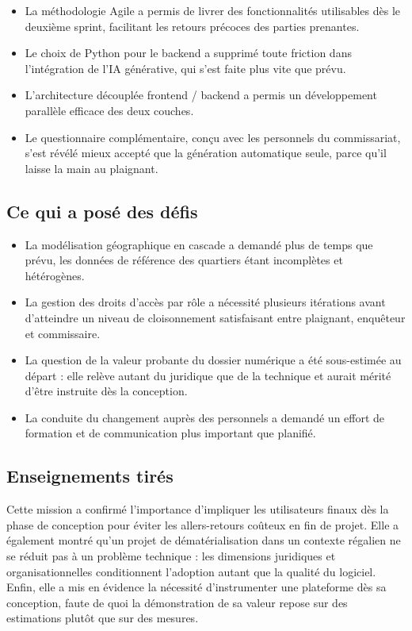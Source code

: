 \begin{itemize}
    \item La méthodologie Agile a permis de livrer des fonctionnalités utilisables dès le deuxième sprint, facilitant les retours précoces des parties prenantes.
    \item Le choix de Python pour le backend a supprimé toute friction dans l'intégration de l'IA générative, qui s'est faite plus vite que prévu.
    \item L'architecture découplée frontend / backend a permis un développement parallèle efficace des deux couches.
    \item Le questionnaire complémentaire, conçu avec les personnels du commissariat, s'est révélé mieux accepté que la génération automatique seule, parce qu'il laisse la main au plaignant.
\end{itemize}

\subsection{Ce qui a posé des défis}

\begin{itemize}
    \item La modélisation géographique en cascade a demandé plus de temps que prévu, les données de référence des quartiers étant incomplètes et hétérogènes.
    \item La gestion des droits d'accès par rôle a nécessité plusieurs itérations avant d'atteindre un niveau de cloisonnement satisfaisant entre plaignant, enquêteur et commissaire.
    \item La question de la valeur probante du dossier numérique a été sous-estimée au départ : elle relève autant du juridique que de la technique et aurait mérité d'être instruite dès la conception.
    \item La conduite du changement auprès des personnels a demandé un effort de formation et de communication plus important que planifié.
\end{itemize}

\subsection{Enseignements tirés}

Cette mission a confirmé l'importance d'impliquer les utilisateurs finaux dès la phase de conception pour éviter les allers-retours coûteux en fin de projet. Elle a également montré qu'un projet de dématérialisation dans un contexte régalien ne se réduit pas à un problème technique : les dimensions juridiques et organisationnelles conditionnent l'adoption autant que la qualité du logiciel. Enfin, elle a mis en évidence la nécessité d'instrumenter une plateforme dès sa conception, faute de quoi la démonstration de sa valeur repose sur des estimations plutôt que sur des mesures.
